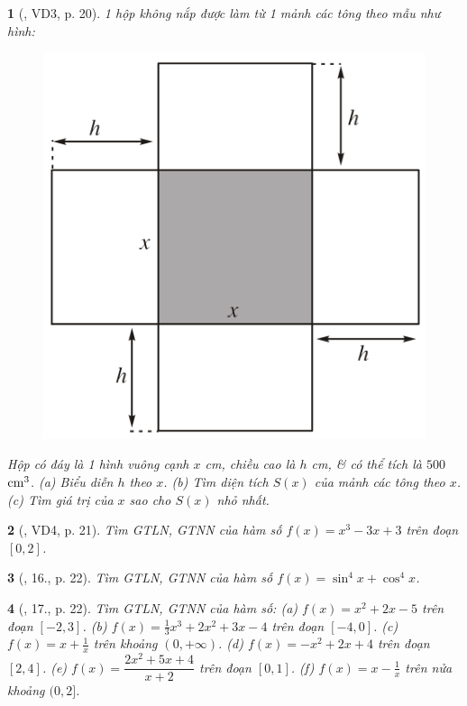 \documentclass{article}
\newtheorem{baitoan}{}
\begin{document}
\begin{baitoan}[\cite{SGK_Toan_12_giai_tich_nang_cao}, VD3, p. 20]
	1 hộp không nắp được làm từ 1 mảnh các tông theo mẫu như hình:
	\begin{figure}[H]
		\centering
		\includegraphics[scale=.25]{hop_khong_nap}
	\end{figure}
	\noindent Hộp có đáy là 1 hình vuông cạnh $x$ {\rm cm}, chiều cao là $h$ {\rm cm}, \& có thể tích là $500$ $\rm cm^3$. (a) Biểu diễn $h$ theo $x$. (b) Tìm diện tích $S(x)$ của mảnh các tông theo $x$. (c) Tìm giá trị của $x$ sao cho $S(x)$ nhỏ nhất.
\end{baitoan}

\begin{baitoan}[\cite{SGK_Toan_12_giai_tich_nang_cao}, VD4, p. 21]
	Tìm {\rm GTLN, GTNN} của hàm số $f(x) = x^3 - 3x + 3$ trên đoạn $[0,2]$.
\end{baitoan}

\begin{baitoan}[\cite{SGK_Toan_12_giai_tich_nang_cao}, 16., p. 22]
	Tìm {\rm GTLN, GTNN} của hàm số $f(x) = \sin^4x + \cos^4x$.
\end{baitoan}

\begin{baitoan}[\cite{SGK_Toan_12_giai_tich_nang_cao}, 17., p. 22]
	Tìm {\rm GTLN, GTNN} của hàm số: (a) $f(x) = x^2 + 2x - 5$ trên đoạn $[-2,3]$. (b) $f(x) = \frac{1}{3}x^3 + 2x^2 + 3x - 4$ trên đoạn $[-4,0]$. (c) $f(x) = x + \frac{1}{x}$ trên khoảng $(0,+\infty)$. (d) $f(x) = -x^2 + 2x + 4$ trên đoạn $[2,4]$. (e) $f(x) = \dfrac{2x^2 + 5x + 4}{x + 2}$ trên đoạn $[0,1]$. (f) $f(x) = x - \frac{1}{x}$ trên nửa khoảng $(0,2]$.
\end{baitoan}
\end{document}
